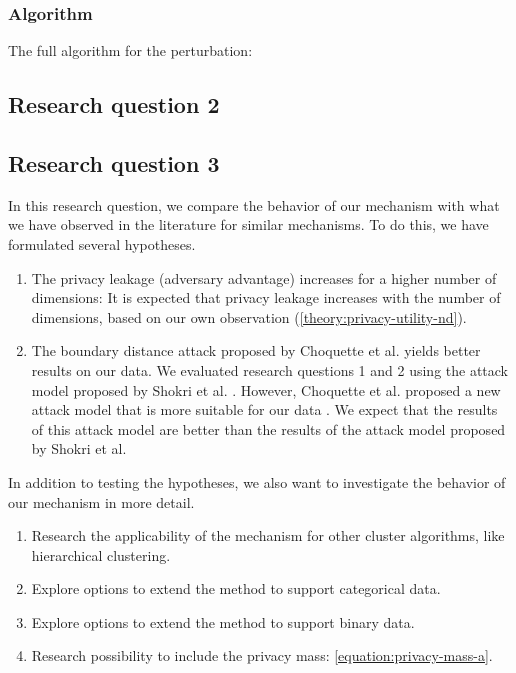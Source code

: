 \subsubsection{Algorithm}
The full algorithm for the perturbation:


\subsection{Research question 2}

\subsection{Research question 3}

In this research question, we compare the behavior of our mechanism with what we have observed in the literature for similar mechanisms.
To do this, we have formulated several hypotheses.
\begin{enumerate}
  \item The privacy leakage (adversary advantage) increases for a higher number of dimensions:
        It is expected that privacy leakage increases with the number of dimensions, based on our own observation (\ref{theory:privacy-utility-nd}).
  \item The boundary distance attack proposed by Choquette et al. yields better results on our data.
        We evaluated research questions 1 and 2 using the attack model proposed by Shokri et al. \cite{shokri_membership_2017}.
        However, Choquette et al. proposed a new attack model that is more suitable for our data \cite{choquette_privacy-preserving_2019}.
        We expect that the results of this attack model are better than the results of the attack model proposed by Shokri et al.
\end{enumerate}
In addition to testing the hypotheses, we also want to investigate the behavior of our mechanism in more detail.
\begin{enumerate}
  \item Research the applicability of the mechanism for other cluster algorithms, like hierarchical clustering.
  \item Explore options to extend the method to support categorical data.
  \item Explore options to extend the method to support binary data.
  \item Research possibility to include the privacy mass: \ref{equation:privacy-mass-a}.
\end{enumerate}
